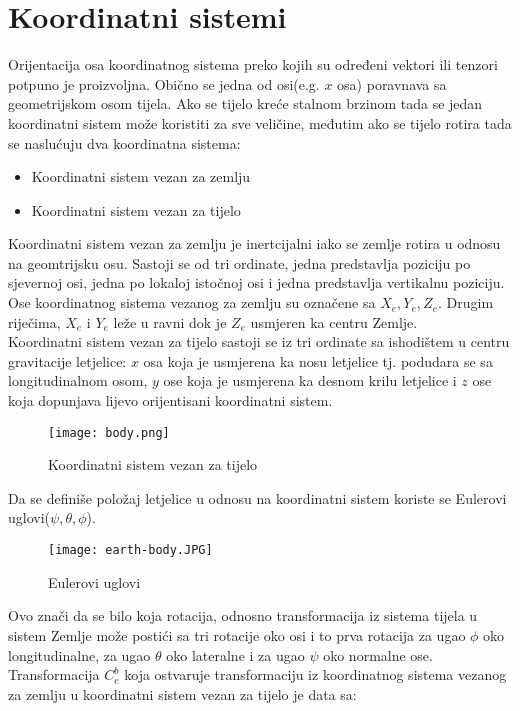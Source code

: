 \section{Koordinatni sistemi}
Orijentacija osa koordinatnog sistema preko kojih su određeni 
vektori ili tenzori potpuno je proizvoljna. Obično se jedna od osi(e.g. $x$ osa) poravnava 
sa geometrijskom osom tijela. 
Ako se tijelo kreće stalnom brzinom tada se jedan koordinatni sistem može 
koristiti za sve veličine, međutim ako se tijelo rotira tada se naslućuju dva koordinatna sistema:
\begin{itemize}
    \item Koordinatni sistem vezan za zemlju
    \item Koordinatni sistem vezan za tijelo
\end{itemize}
Koordinatni sistem vezan za zemlju je inertcijalni iako se zemlje rotira u odnosu na geomtrijsku osu.
Sastoji se od tri ordinate, jedna predstavlja poziciju po sjevernoj osi, jedna po lokaloj istočnoj osi 
i jedna predstavlja vertikalnu poziciju. Ose koordinatnog sistema vezanog za zemlju su 
označene sa $X_e, Y_e, Z_e$. Drugim riječima, $X_e$ i $Y_e$ leže u ravni dok je $Z_e$ usmjeren ka centru Zemlje.\\
Koordinatni sistem vezan za tijelo sastoji se iz tri ordinate sa ishodištem u centru gravitacije letjelice: $x$ osa koja je
usmjerena ka nosu letjelice tj. podudara se sa longitudinalnom osom, $y$ ose koja je usmjerena ka desnom krilu letjelice i $z$ ose koja dopunjava lijevo orijentisani 
koordinatni sistem.
\begin{figure}[!ht]
    \centering
    \texttt{[image: body.png]}
    \caption{Koordinatni sistem vezan za tijelo}
    \label{fig:KBS}
\end{figure}
Da se definiše položaj letjelice u odnosu na koordinatni sistem koriste se Eulerovi uglovi($\psi, \theta, \phi$).
\begin{figure}[!ht]
    \centering
    \texttt{[image: earth-body.JPG]}
    \caption{Eulerovi uglovi}
\end{figure}
Ovo znači da se bilo koja rotacija, odnosno transformacija iz sistema tijela u sistem Zemlje može postići sa tri rotacije oko osi i to prva 
rotacija za ugao $\phi$ oko longitudinalne, za ugao $\theta$ oko lateralne i za ugao 
$\psi$ oko normalne ose. Transformacija $C_e^b$ koja ostvaruje transformaciju iz 
koordinatnog sistema vezanog za zemlju u koordinatni sistem vezan za tijelo je data sa:
